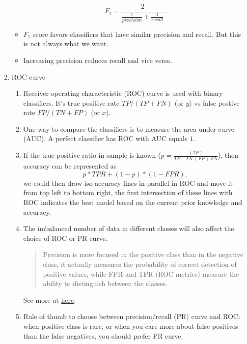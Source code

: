 \documentclass[12pt,oneside,a4paper]{article}
\numberwithin{equation}{section}
\begin{document}
\begin{enumerate}
\begin{itemize}
\begin{equation*}
F_1 = \frac{2}{\frac{1}{precision} + \frac{1}{recall}}.
\end{equation*}

\item $F_1$ score favors classifiers that have similar precision and recall. But this is not always what we want. 

\item Increasing precision reduces recall and vice versa. 
\end{itemize}

\item ROC curve 

\begin{enumerate}
\item Receiver operating characteristic (ROC) curve is used with binary classifiers. It's true positive rate $TP/(TP + FN)$ (or $y$) vs false postive rate $FP/(TN + FP)$ (or $x$).
\item One way to compare the classifiers is to measure the area under curve (AUC). A perfect classifier has ROC with AUC equals $1$.

\item If the true positive ratio in sample is known ($p = \frac{(TP)}{TP + TN + FP + FN}$), then accuracy can be represented as 
\begin{equation}
p * TPR + (1-p) * (1 - FPR),
\end{equation}
we could then draw iso-accuracy lines in parallel in ROC and move it from top left to bottom right, the first intersection of these lines with ROC indicates the best model based on the current prior knowledge and accuracy. 
\item The imbalanced number of data in different classes will also affect the choice of ROC or PR curve. 
\begin{quote}
Precision is more focused in the positive class than in the negative class, it actually measures the probability of correct detection of positive values, while FPR and TPR (ROC metrics) measure the ability to distinguish between the classes.
\end{quote} 
See more at \href{https://towardsdatascience.com/what-metrics-should-we-use-on-imbalanced-data-set-precision-recall-roc-e2e79252aeba}{here}.
\item Rule of thumb to choose between precision/recall (PR) curve and ROC: when positive class is rare, or when you care more about false positives than the false negatives, you should prefer PR curve. 
\end{enumerate}
\end{enumerate}
\end{document}
